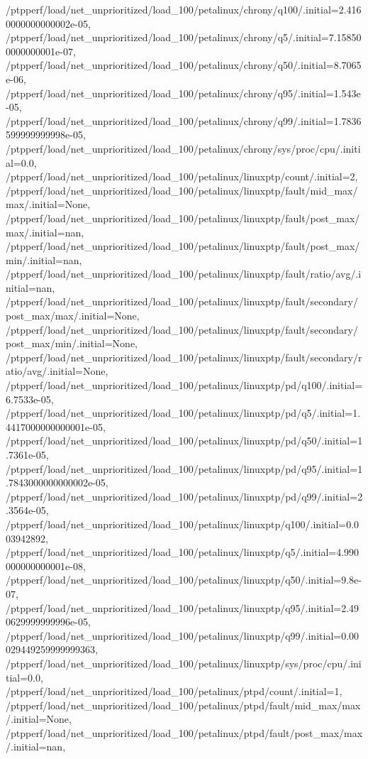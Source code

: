 {    /ptpperf/load/net_unprioritized/load_100/petalinux/chrony/q100/.initial=2.4160000000000002e-05,
    /ptpperf/load/net_unprioritized/load_100/petalinux/chrony/q5/.initial=7.158500000000001e-07,
    /ptpperf/load/net_unprioritized/load_100/petalinux/chrony/q50/.initial=8.7065e-06,
    /ptpperf/load/net_unprioritized/load_100/petalinux/chrony/q95/.initial=1.543e-05,
    /ptpperf/load/net_unprioritized/load_100/petalinux/chrony/q99/.initial=1.7836599999999998e-05,
    /ptpperf/load/net_unprioritized/load_100/petalinux/chrony/sys/proc/cpu/.initial=0.0,
    /ptpperf/load/net_unprioritized/load_100/petalinux/linuxptp/count/.initial=2,
    /ptpperf/load/net_unprioritized/load_100/petalinux/linuxptp/fault/mid_max/max/.initial=None,
    /ptpperf/load/net_unprioritized/load_100/petalinux/linuxptp/fault/post_max/max/.initial=nan,
    /ptpperf/load/net_unprioritized/load_100/petalinux/linuxptp/fault/post_max/min/.initial=nan,
    /ptpperf/load/net_unprioritized/load_100/petalinux/linuxptp/fault/ratio/avg/.initial=nan,
    /ptpperf/load/net_unprioritized/load_100/petalinux/linuxptp/fault/secondary/post_max/max/.initial=None,
    /ptpperf/load/net_unprioritized/load_100/petalinux/linuxptp/fault/secondary/post_max/min/.initial=None,
    /ptpperf/load/net_unprioritized/load_100/petalinux/linuxptp/fault/secondary/ratio/avg/.initial=None,
    /ptpperf/load/net_unprioritized/load_100/petalinux/linuxptp/pd/q100/.initial=6.7533e-05,
    /ptpperf/load/net_unprioritized/load_100/petalinux/linuxptp/pd/q5/.initial=1.4417000000000001e-05,
    /ptpperf/load/net_unprioritized/load_100/petalinux/linuxptp/pd/q50/.initial=1.7361e-05,
    /ptpperf/load/net_unprioritized/load_100/petalinux/linuxptp/pd/q95/.initial=1.7843000000000002e-05,
    /ptpperf/load/net_unprioritized/load_100/petalinux/linuxptp/pd/q99/.initial=2.3564e-05,
    /ptpperf/load/net_unprioritized/load_100/petalinux/linuxptp/q100/.initial=0.003942892,
    /ptpperf/load/net_unprioritized/load_100/petalinux/linuxptp/q5/.initial=4.990000000000001e-08,
    /ptpperf/load/net_unprioritized/load_100/petalinux/linuxptp/q50/.initial=9.8e-07,
    /ptpperf/load/net_unprioritized/load_100/petalinux/linuxptp/q95/.initial=2.490629999999996e-05,
    /ptpperf/load/net_unprioritized/load_100/petalinux/linuxptp/q99/.initial=0.00029449259999999363,
    /ptpperf/load/net_unprioritized/load_100/petalinux/linuxptp/sys/proc/cpu/.initial=0.0,
    /ptpperf/load/net_unprioritized/load_100/petalinux/ptpd/count/.initial=1,
    /ptpperf/load/net_unprioritized/load_100/petalinux/ptpd/fault/mid_max/max/.initial=None,
    /ptpperf/load/net_unprioritized/load_100/petalinux/ptpd/fault/post_max/max/.initial=nan,
}
